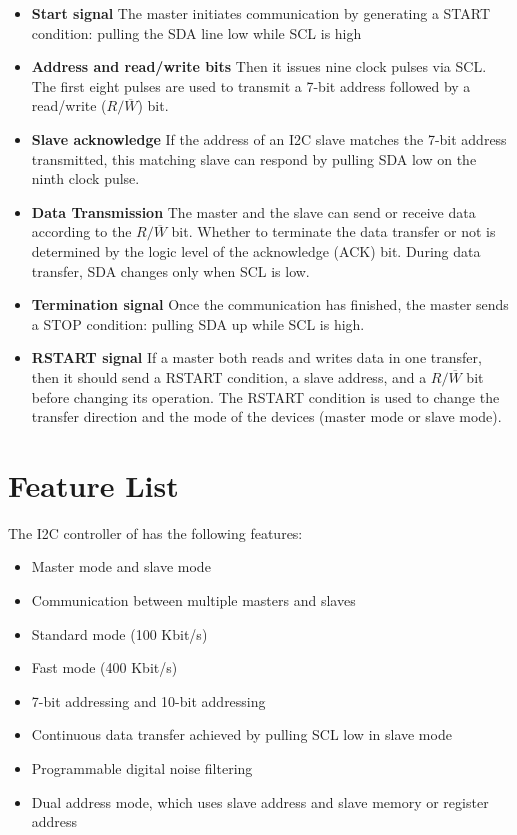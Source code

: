 \documentclass[main\_\_EN.tex]{subfiles}
\begin{document}
\begin{itemize}
    \item \textbf{Start signal}
    The master initiates communication by generating a START condition: pulling the SDA line low while SCL is high

    \item \textbf{Address and read/write bits}
    Then it issues nine clock pulses via SCL. The first eight pulses are used to transmit a 7-bit address followed by a read/write ($R/\overline W$) bit.

    \item \textbf{Slave acknowledge}
    If the address of an I2C slave matches the 7-bit address transmitted, this matching slave can respond by pulling SDA low on the ninth clock pulse.

    \item \textbf{Data Transmission}
    The master and the slave can send or receive data according to the $R/\overline W$ bit. Whether to terminate the data transfer or not is determined by the logic level of the acknowledge (ACK) bit. During data transfer, SDA changes only when SCL is low.

    \item \textbf{Termination signal}
    Once the communication has finished, the master sends a STOP condition: pulling SDA up while SCL is high.

    \item \textbf{RSTART signal}
    If a master both reads and writes data in one transfer, then it should send a RSTART condition, a slave address, and a $R/\overline W$ bit before changing its operation. The RSTART condition is used to change the transfer direction and the mode of the devices (master mode or slave mode).
\end{itemize}

\section{Feature List}

The I2C controller of \chipname{} has the following features:

\begin{itemize}
    \item Master mode and slave mode
    \item Communication between multiple masters and slaves
    \item Standard mode (100 Kbit/s)
    \item Fast mode (400 Kbit/s)
    \item 7-bit addressing and 10-bit addressing
    \item Continuous data transfer achieved by pulling SCL low in slave mode
    \item Programmable digital noise filtering
    \item Dual address mode, which uses slave address and slave memory or register address
\end{itemize}
\end{document}
